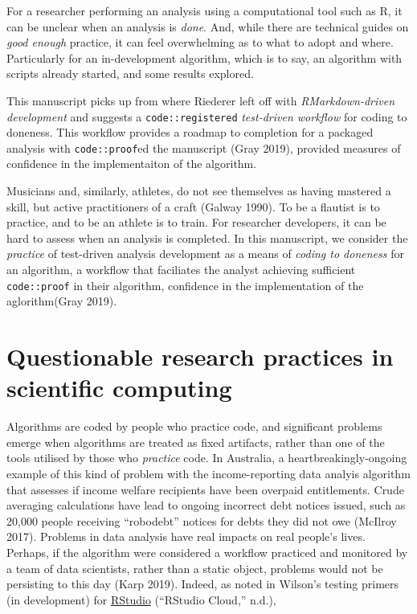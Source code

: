 \documentclass[
]{article}
\begin{document}
For a researcher performing an analysis using a computational tool such
as R, it can be unclear when an analysis is \emph{done}. And, while
there are technical guides on \emph{good enough} practice, it can feel
overwhelming as to what to adopt and where. Particularly for an
in-development algorithm, which is to say, an algorithm with scripts
already started, and some results explored.

This manuscript picks up from where Riederer left off with
\emph{RMarkdown-driven development} and suggests a
\texttt{code::registered} \emph{test-driven workflow} for coding to
doneness. This workflow provides a roadmap to completion for a packaged
analysis with \texttt{code::proof}ed the manuscript (Gray 2019),
provided measures of confidence in the implementaiton of the algorithm.

Musicians and, similarly, athletes, do not see themselves as having
mastered a skill, but active practitioners of a craft (Galway 1990). To
be a flautist is to practice, and to be an athlete is to train. For
researcher developers, it can be hard to assess when an analysis is
completed. In this manuscript, we consider the \emph{practice} of
test-driven analysis development as a means of \emph{coding to doneness}
for an algorithm, a workflow that faciliates the analyst achieving
sufficient \texttt{code::proof} in their algorithm, confidence in the
implementation of the aglorithm(Gray 2019).

\hypertarget{questionable-research-practices-in-scientific-computing}{%
\section{Questionable research practices in scientific
computing}\label{questionable-research-practices-in-scientific-computing}}

Algorithms are coded by people who practice code, and significant
problems emerge when algorithms are treated as fixed artifacts, rather
than one of the tools utilised by those who \emph{practice} code. In
Australia, a heartbreakingly-ongoing example of this kind of problem
with the income-reporting data analyis algorithm that assesses if income
welfare recipients have been overpaid entitlements. Crude averaging
calculations have lead to ongoing incorrect debt notices issued, such as
20,000 people receiving ``robodebt'' notices for debts they did not owe
(McIlroy 2017). Problems in data analysis have real impacts on real
people's lives. Perhaps, if the algorithm were considered a workflow
practiced and monitored by a team of data scientists, rather than a
static object, problems would not be persisting to this day (Karp 2019).
Indeed, as noted in Wilson's testing primers (in development) for
\href{https://rstudio.cloud/learn/primers}{RStudio} (``RStudio Cloud,''
n.d.),
\end{document}
